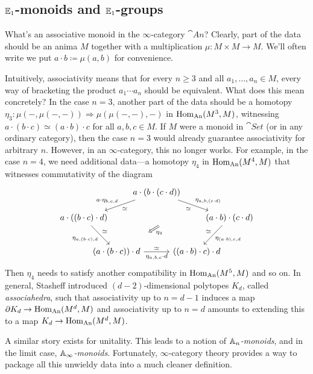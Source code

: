 \subsection{\texorpdfstring{$\mathbb{E}_1$}{E-1}-monoids and \texorpdfstring{$\mathbb{E}_1$}{E1}-groups}\label{subsec:E1}
\begin{numpar}[Associahedra.]\label{par:AssociahedraI}
	What's an associative monoid in the $\infty$-category $\cat{An}$? Clearly, part of the data should be an anima $M$ together with a multiplication $\mu\colon M\times M\rightarrow M$. We'll often write we put $a\cdot b\coloneqq \mu(a,b)$ for convenience.
	
	Intuitively, associativity means that for every $n\geqslant 3$ and all $a_1,\dotsc,a_n\in M$, every way of bracketing the product $a_1\dotsb a_n$ should be equivalent. What does this mean concretely? In the case $n=3$, another part of the data should be a homotopy $\eta_3\colon \mu(-,\mu(-,-))\Rightarrow \mu(\mu(-,-),-)$ in $\operatorname{Hom}_{\mathrm{An}}(M^3,M)$, witnessing $a\cdot(b\cdot c)\simeq (a\cdot b)\cdot c$ for all $a,b,c\in M$. If $M$ were a monoid in $\cat{Set}$ (or in any ordinary category), then the case $n=3$ would already guarantee associativity for arbitrary $n$. However, in an $\infty$-category, this no longer works. For example, in the case $n=4$, we need additional data---a homotopy $\eta_4$ in $\operatorname{Hom}_{\mathrm{An}}(M^4,M)$ that witnesses commutativity of the diagram
	\begin{equation*}
		\begin{tikzcd}
			&[-5em] &[-4.125em] a\cdot\left(b\cdot(c\cdot d)\right)\ar[dll,"a\cdot \eta_{b,c,d}"',"\simeq"]\ar[drr,"\eta_{a,b,(c\cdot d)}","\simeq"']\ar[drr,phantom,""{name=A}]\arrow[from=A,to=3-2,end anchor=center,draw=none,"\Longleftarrow"{sloped,marking,pos=0.5},"\eta_4"] &[-4.125em] &[-5em] \\[-0.5em]
			a\cdot \left((b\cdot c)\cdot d\right)\drar["\eta_{a,(b\cdot c),d}"',"\simeq"] & & & & (a\cdot b)\cdot (c\cdot d)\dlar["\eta_{(a\cdot b),c,d}","\simeq"'] \\[0.5em]
			& \left(a\cdot (b\cdot c)\right)\cdot d\ar[rr,"\eta_{a,b,c}\cdot d"',"\simeq"] & & \left((a\cdot b)\cdot c\right)\cdot d & 
		\end{tikzcd}
	\end{equation*}
	Then $\eta_4$ needs to satisfy another compatibility in $\operatorname{Hom}_{\mathrm{An}}(M^5,M)$ and so on. In general, Stasheff \cite{Stasheff} introduced $(d-2)$-dimensional polytopes $K_d$, called \emph{associahedra}, such that associativity up to $n=d-1$ induces a map $\partial K_d\rightarrow \operatorname{Hom}_{\mathrm{An}}(M^d,M)$ and associativity up to $n=d$ amounts to extending this to a map $K_d\rightarrow\operatorname{Hom}_{\mathrm{An}}(M^d,M)$.
	
	A similar story exists for unitality. This leads to a notion of \emph{$\mathbb{A}_n$-monoids}, and in the limit case, \emph{$\mathbb{A}_\infty$-monoids}. Fortunately, $\infty$-category theory provides a way to package all this unwieldy data into a much cleaner definition.
\end{numpar}

